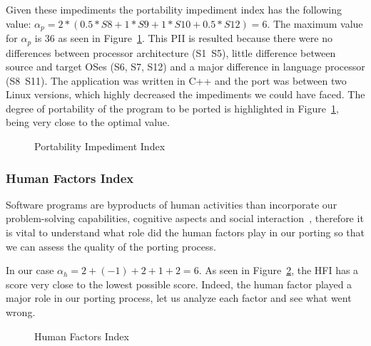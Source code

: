 Given these impediments the portability impediment index has the following
value: $\alpha_p = 2 * (0.5 * S8 + 1 * S9 + 1 * S10 + 0.5 * S12) = 6$. The
maximum value for $\alpha_p$ is 36 as seen in Figure~\ref{fig:PII}. This PII is
resulted because there were no differences between processor architecture
(S1~S5), little difference between source and target OSes (S6, S7, S12) and a
major difference in language processor (S8~S11). The application was written in
C++ and the port was between two Linux versions, which highly decreased the
impediments we could have faced. The degree of portability of the program to be
ported is highlighted in Figure~\ref{fig:PII}, being very close to the optimal
value.

\begin{figure}

    \caption{Portability Impediment Index }
    \label{fig:PII}
\end{figure}


\subsubsection{Human Factors Index}

Software programs are byproducts of human activities than incorporate our
problem-solving capabilities, cognitive aspects and social
interaction~\cite{b5}, therefore it is vital to understand what role did the
human factors play in our porting so that we can assess the quality of the
porting process. 

In our case $\alpha_h = 2 + (-1) + 2 + 1 + 2 = 6$. As seen in
Figure~\ref{fig:HFI}, the HFI has a score very close to the lowest possible
score. Indeed, the human factor played a major role in our porting process, let
us analyze each factor and see what went wrong.

\begin{figure}

    \caption{Human Factors Index }
    \label{fig:HFI}
\end{figure}

